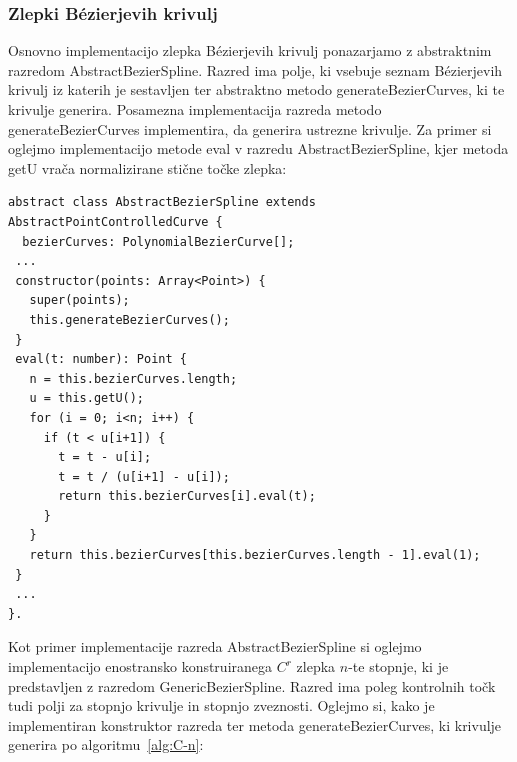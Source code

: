 \documentclass[isrm2, tisk]{fmfdelo}
\begin{document}
    \subsubsection*{Zlepki Bézierjevih krivulj}
    Osnovno implementacijo zlepka Bézierjevih krivulj ponazarjamo z abstraktnim razredom AbstractBezierSpline.
    Razred ima polje, ki vsebuje seznam Bézierjevih krivulj iz katerih je sestavljen ter abstraktno metodo generateBezierCurves, ki te krivulje generira.
    Posamezna implementacija razreda metodo generateBezierCurves implementira, da generira ustrezne krivulje.
    Za primer si oglejmo implementacijo metode eval v razredu AbstractBezierSpline, kjer metoda getU vrača normalizirane stične točke zlepka:
    \begin{lstlisting}[label={lst:zlepek}]
abstract class AbstractBezierSpline extends AbstractPointControlledCurve {
  bezierCurves: PolynomialBezierCurve[];
 ...
 constructor(points: Array<Point>) {
   super(points);
   this.generateBezierCurves();
 }
 eval(t: number): Point {
   n = this.bezierCurves.length;
   u = this.getU();
   for (i = 0; i<n; i++) {
     if (t < u[i+1]) {
       t = t - u[i];
       t = t / (u[i+1] - u[i]);
       return this.bezierCurves[i].eval(t);
     }
   }
   return this.bezierCurves[this.bezierCurves.length - 1].eval(1);
 }
 ...
}.
    \end{lstlisting}
    Kot primer implementacije razreda AbstractBezierSpline si oglejmo implementacijo enostransko konstruiranega $C^r$ zlepka $n$-te stopnje, ki je predstavljen z razredom GenericBezierSpline.
    Razred ima poleg kontrolnih točk tudi polji za stopnjo krivulje in stopnjo zveznosti.
    Oglejmo si, kako je implementiran konstruktor razreda ter metoda generateBezierCurves, ki krivulje generira po algoritmu~\ref{alg:C-n}:
\end{document}
